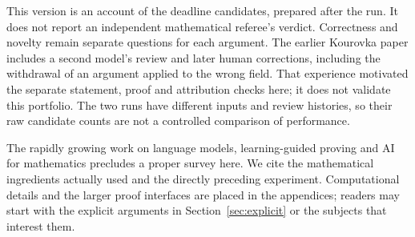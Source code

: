 This version is an account of the deadline candidates, prepared after
the run. It does not report an independent mathematical referee's verdict.
Correctness and novelty remain separate questions for each argument.
The earlier Kourovka paper includes a second model's review and later
human corrections, including the withdrawal of an argument applied to
the wrong field. That experience motivated the separate statement,
proof and attribution checks here; it does not validate this portfolio.
The two runs have different inputs and review histories, so their raw
candidate counts are not a controlled comparison of performance.

The rapidly growing work on language models, learning-guided proving
and AI for mathematics precludes a proper survey here. We cite the
mathematical ingredients actually used and the directly preceding
experiment. Computational details and the larger proof interfaces are
placed in the appendices; readers may start with the explicit arguments
in Section~\ref{sec:explicit} or the subjects that interest them.
